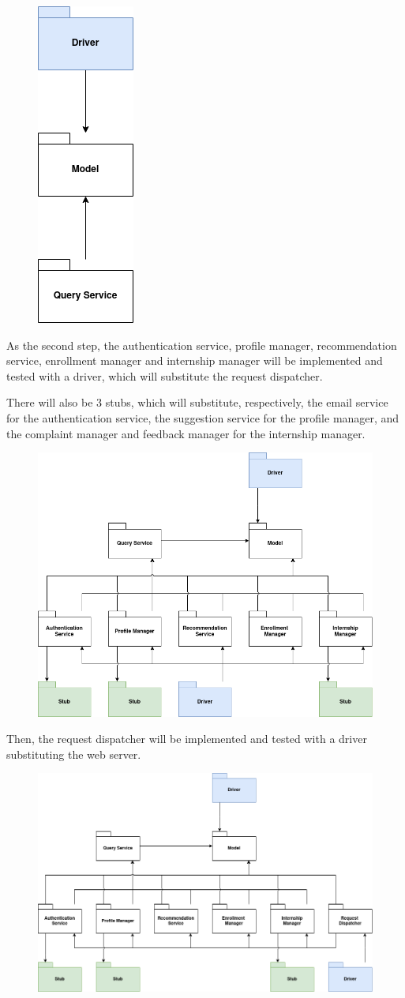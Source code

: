\begin{figure}[H]
    \centering
    \includegraphics[width=0.1\linewidth]{../../assets/implementation-plan-diagrams/implementation-plan-1.png}
\end{figure}

As the second step, the authentication service, profile manager, recommendation service, enrollment manager and internship manager will be implemented and tested with a driver, which will substitute the request dispatcher.

There will also be 3 stubs, which will substitute, respectively, the email service for the authentication service, the suggestion service for the profile manager, and the complaint manager and feedback manager for the internship manager.

\begin{figure}[H]
    \centering
    \includegraphics[width=0.7\linewidth]{../../assets/implementation-plan-diagrams/implementation-plan-2.png}
\end{figure}

Then, the request dispatcher will be implemented and tested with a driver substituting the web server.

\begin{figure}[H]
    \centering
    \includegraphics[width=0.8\linewidth]{../../assets/implementation-plan-diagrams/implementation-plan-3.png}
\end{figure}

